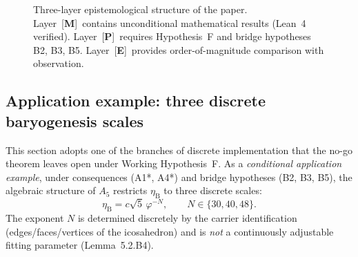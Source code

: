 \documentclass[sn-mathphys-num,Numbered]{sn-jnl}
\theoremstyle{thmstyleone}
\theoremstyle{thmstylethree}
\theoremstyle{thmstyletwo}
\newcommand{\etaB}{\eta_{\mathrm{B}}}
\newcommand{\tagM}{[\textbf{M}]}
\newcommand{\tagP}{[\textbf{P}]}
\newcommand{\tagE}{[\textbf{E}]}
\begin{document}
\begin{figure}[t]
\caption{Three-layer epistemological structure of the paper.
Layer~\tagM\ contains unconditional mathematical results (Lean~4 verified).
Layer~\tagP\ requires Hypothesis~F and bridge hypotheses B2, B3, B5.
Layer~\tagE\ provides order-of-magnitude comparison with observation.}
\label{fig:epistemology}
\end{figure}

\subsection{Application example: three discrete baryogenesis scales}
\label{ssec:three-scales}

This section adopts one of the branches of discrete implementation that
the no-go theorem leaves open under Working Hypothesis~F.  As a
\emph{conditional application example}, under consequences (A1*, A4*)
and bridge hypotheses (B2, B3, B5), the algebraic structure of $A_5$
restricts $\etaB$ to three discrete scales:
\begin{equation}
  \etaB = c\sqrt{5}\,\varphi^{-N},
  \qquad N \in \{30, 40, 48\}.
\end{equation}
The exponent $N$ is determined discretely by the carrier identification
(edges/faces/vertices of the icosahedron) and is \emph{not} a
continuously adjustable fitting parameter (Lemma~5.2.B4).
\end{document}
